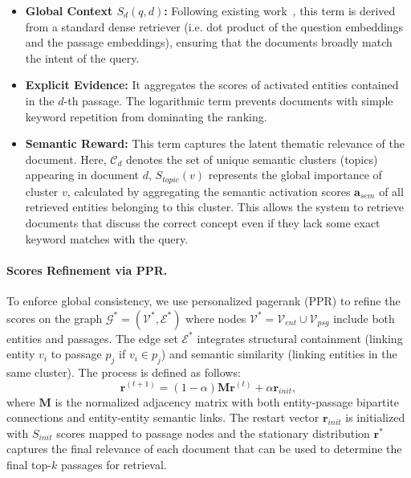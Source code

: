 \begin{itemize}
    \item \textbf{Global Context $S_{d}(q, d)$:} Following existing work~\cite{zhuang2025linearrag,zhao20252graphrag}, this term is derived from a standard dense retriever (i.e. dot product of the question embeddings and the passage embeddings), ensuring that the documents broadly match the intent of the query.
    \item \textbf{Explicit Evidence:} It aggregates the scores of activated entities contained in the $d$-th passage. The logarithmic term prevents documents with simple keyword repetition from dominating the ranking.
    \item \textbf{Semantic Reward:} This term captures the latent thematic relevance of the document. Here, $\mathcal{C}_d$ denotes the set of unique semantic clusters (topics) appearing in document $d$, $S_{topic}(v)$ represents the global importance of cluster $v$, calculated by aggregating the semantic activation scores $\mathbf{a}_{sem}$ of all retrieved entities belonging to this cluster. This allows the system to retrieve documents that discuss the correct concept even if they lack some exact keyword matches with the query.
\end{itemize}

\paragraph{Scores Refinement via PPR.}
To enforce global consistency, we use personalized pagerank (PPR) to refine the scores on the graph $\mathcal{G}^*=(\mathcal{V}^*, \mathcal{E}^*)$ where nodes $\mathcal{V}^* = \mathcal{V}_{ent} \cup \mathcal{V}_{psg}$ include both entities and passages. The edge set $\mathcal{E}^*$ integrates structural containment (linking entity $v_i$ to passage $p_j$ if $v_i \in p_j$) and semantic similarity (linking entities in the same cluster). The process is defined as follows:
\begin{equation}
    \mathbf{r}^{(t+1)} = (1-\alpha) \mathbf{M} \mathbf{r}^{(t)} + \alpha \mathbf{r}_{init},
\end{equation}
where $\mathbf{M}$ is the normalized adjacency matrix with both entity-passage bipartite connections and entity-entity semantic links. The restart vector $\mathbf{r}_{init}$ is initialized with $S_{init}$ scores mapped to passage nodes and the stationary distribution $\mathbf{r}^{*}$ captures the final relevance of each document that can be used to determine the final top-$k$ passages for retrieval.

